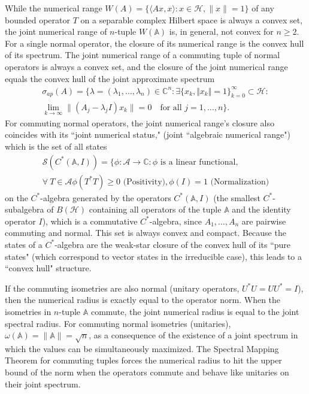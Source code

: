 \documentclass[12pt]{article}
\begin{document}
While the numerical range $W(A)=\{\langle Ax,x\rangle: x\in \mathcal{H}, \|x\|=1\}$ of any bounded operator $T$ on a separable complex Hilbert space is always a convex set,
the joint numerical range of $n$-tuple $W(\mathbb{A})$ is, in general, not convex for $n\ge 2$.
For a single normal operator, the closure of its numerical range is the convex hull of its spectrum.
The joint numerical range of a commuting tuple of normal operators is always a convex set, and the closure of the joint numerical range
equals the convex hull of the joint approximate spectrum
\begin{multline*}
 \sigma_{ap}(A)=\{\lambda = (\lambda_1, \dots, \lambda_n) \in \mathbb{C}^n: \exists \{x_k, \Vert x_k \Vert=1\}_{k=0}^{\infty} \subset \mathcal{H}: \\
 \lim\limits_{k \to \infty} \|(A_j - \lambda_j I)x_k\| = 0 \quad \text{for all } j = 1, \dots, n \}.
\end{multline*}
For commuting normal operators, the joint numerical range's closure also coincides with its ``joint numerical status," (joint ``algebraic numerical range") which is the set of all states
\begin{multline*}
\mathcal{S}(C^*(\mathbb{A}, I))=\{\phi: \mathcal{A} \to \mathbb{C}: \phi \text{ is a linear functional},  \\
\forall\ T \in \mathcal{A} \phi(T^*T) \geq 0 \text{ (Positivity)},
 \phi(I) = 1 \text{ (Normalization)}
\end{multline*}
on the
$C^*$-algebra generated by the operators $C^*(\mathbb{A}, I)$ (the smallest $C^*$-subalgebra of $B(\mathcal{H})$ containing all operators of the tuple $\mathbb{A}$ and the identity operator $I$), which is
a commutative $C^*$-algebra, since  $A_1, \dots, A_n$ are pairwise commuting and normal.
This set is always convex and compact. Because the states of a
$C^*$-algebra are the weak-star closure of the convex hull of its ``pure states" (which correspond to vector states
in the irreducible case), this leads to a ``convex hull" structure.

If the commuting isometries are also normal (unitary operators, $U^*U=UU^*=I$), then the numerical radius is exactly equal to the operator norm.
When the isometries in $n$-tuple $\mathbb{A}$ commute, the joint numerical radius is equal to the joint spectral radius.
For commuting normal isometries (unitaries),  $ \omega(\mathbb{A}) = \|\mathbb{A}\| = \sqrt{n} $, as a consequence of the existence of a joint spectrum in which the values can be simultaneously maximized.
The Spectral Mapping Theorem for commuting tuples forces the numerical radius to hit the upper bound of the norm when the operators commute and behave like unitaries on their joint spectrum.
\end{document}
